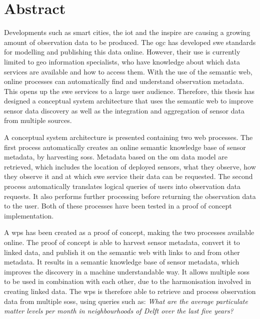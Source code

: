 
\chapter*{Abstract}


Developments such as smart cities, the \acf*{iot} and the \ac*{inspire} are causing a growing amount of observation data to be produced. The \ac*{ogc} has developed \ac*{swe} standards for modelling and publishing this data online. However, their use is currently limited to geo information specialists, who have knowledge about which data services are available and how to access them. With the use of the semantic web, online processes can automatically find and understand observation metadata. This opens up the \acs*{swe} services to a large user audience. Therefore, this thesis has designed a conceptual system architecture that uses the semantic web to improve sensor data discovery as well as the integration and aggregation of sensor data from multiple sources.

A conceptual system architecture is presented containing two web processes. The first process automatically creates an online semantic knowledge base of sensor metadata, by harvesting \aclp*{sos}. Metadata based on the \acf*{om} data model are retrieved, which includes the location of deployed sensors, what they observe, how they observe it and at which \acs*{swe} service their data can be requested. The second process automatically translates logical queries of users into observation data requests. It also performs further processing before returning the observation data to the user. Both of these processes have been tested in a proof of concept implementation.

A \ac*{wps} has been created as a proof of concept, making the two processes available online. The proof of concept is able to harvest sensor metadata, convert it to linked data, and publish it on the semantic web with links to and from other metadata. It results in a semantic knowledge base of sensor metadata, which improves the discovery in a machine understandable way. It allows multiple \aclp*{sos} to be used in combination with each other, due to the harmonisation involved in creating linked data. The \acs*{wps} is therefore able to retrieve and process observation data from multiple \aclp*{sos}, using queries such as: \textit{What are the average particulate matter levels per month in neighbourhoods of Delft over the last five years?}  
 
